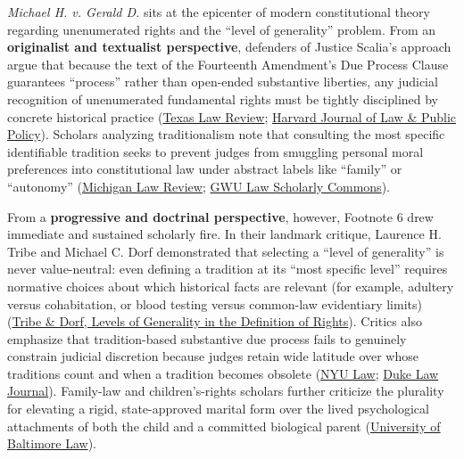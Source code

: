 \documentclass[12pt]{article}
\begin{document}
\textit{Michael H. v. Gerald D.} sits at the epicenter of modern constitutional theory regarding unenumerated rights and the ``level of generality'' problem. From an \textbf{originalist and textualist perspective}, defenders of Justice Scalia's approach argue that because the text of the Fourteenth Amendment's Due Process Clause guarantees ``process'' rather than open-ended substantive liberties, any judicial recognition of unenumerated fundamental rights must be tightly disciplined by concrete historical practice (\href{https://texaslawreview.org/in-defense-of-substantive-due-process/}{Texas Law Review}; \href{https://journals.law.harvard.edu/jlpp/wp-content/uploads/sites/90/2026/03/57_14HarvJLPubPoly8531991.pdf}{Harvard Journal of Law \& Public Policy}). Scholars analyzing traditionalism note that consulting the most specific identifiable tradition seeks to prevent judges from smuggling personal moral preferences into constitutional law under abstract labels like ``family'' or ``autonomy'' (\href{https://repository.law.umich.edu/cgi/viewcontent.cgi?article=1371&context=mlr}{Michigan Law Review}; \href{https://scholarship.law.gwu.edu/cgi/viewcontent.cgi?article=2519&context=faculty_publications}{GWU Law Scholarly Commons}).

From a \textbf{progressive and doctrinal perspective}, however, Footnote 6 drew immediate and sustained scholarly fire. In their landmark critique, Laurence H. Tribe and Michael C. Dorf demonstrated that selecting a ``level of generality'' is never value-neutral: even defining a tradition at its ``most specific level'' requires normative choices about which historical facts are relevant (for example, adultery versus cohabitation, or blood testing versus common-law evidentiary limits) (\href{https://scholarship.law.cornell.edu/cgi/viewcontent.cgi?article=1121&context=facpub}{Tribe \& Dorf, Levels of Generality in the Definition of Rights}). Critics also emphasize that tradition-based substantive due process fails to genuinely constrain judicial discretion because judges retain wide latitude over whose traditions count and when a tradition becomes obsolete (\href{https://www.law.nyu.edu/sites/default/files/ECM_PRO_062707.pdf}{NYU Law}; \href{https://scholarship.law.duke.edu/cgi/viewcontent.cgi?article=3364&context=dlj}{Duke Law Journal}). Family-law and children's-rights scholars further criticize the plurality for elevating a rigid, state-approved marital form over the lived psychological attachments of both the child and a committed biological parent (\href{https://scholarworks.law.ubalt.edu/cgi/viewcontent.cgi?article=2129&context=all_fac}{University of Baltimore Law}).
\end{document}
